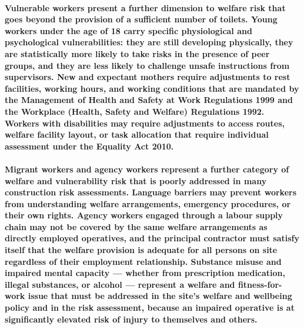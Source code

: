 \paragraph{Vulnerable workers present a further dimension to welfare risk that goes beyond the provision of a sufficient number of toilets. Young workers under the age of 18 carry specific physiological and psychological vulnerabilities: they are still developing physically, they are statistically more likely to take risks in the presence of peer groups, and they are less likely to challenge unsafe instructions from supervisors. New and expectant mothers require adjustments to rest facilities, working hours, and working conditions that are mandated by the Management of Health and Safety at Work Regulations 1999 and the Workplace (Health, Safety and Welfare) Regulations 1992. Workers with disabilities may require adjustments to access routes, welfare facility layout, or task allocation that require individual assessment under the Equality Act 2010.}

\paragraph{Migrant workers and agency workers represent a further category of welfare and vulnerability risk that is poorly addressed in many construction risk assessments. Language barriers may prevent workers from understanding welfare arrangements, emergency procedures, or their own rights. Agency workers engaged through a labour supply chain may not be covered by the same welfare arrangements as directly employed operatives, and the principal contractor must satisfy itself that the welfare provision is adequate for all persons on site regardless of their employment relationship. Substance misuse and impaired mental capacity --- whether from prescription medication, illegal substances, or alcohol --- represent a welfare and fitness-for-work issue that must be addressed in the site's welfare and wellbeing policy and in the risk assessment, because an impaired operative is at significantly elevated risk of injury to themselves and others.}


